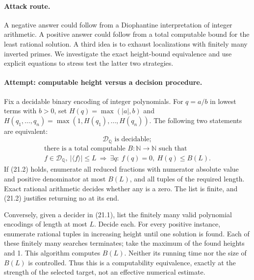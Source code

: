 \documentclass[11pt,a4paper]{article}
\newcommand{\N}{\mathbb{N}}
\newcommand{\Q}{\mathbb{Q}}
\begin{document}
\paragraph{Attack route.}
A negative answer could follow from a Diophantine interpretation of
integer arithmetic. A positive answer could follow from a total
computable bound for the least rational solution. A third idea is to
exhaust localizations with finitely many inverted primes. We investigate
the exact height-bound equivalence and use explicit equations to stress
test the latter two strategies.

\paragraph{Attempt: computable height versus a decision procedure.}
Fix a decidable binary encoding of integer polynomials. For
$q=a/b$ in lowest terms with $b>0$, set
$H(q)=\max(|a|,b)$ and $H(q_1,\ldots,q_n)=\max(1,H(q_1),\ldots,H(q_n))$.
The following two statements are equivalent:
\[
 \mathcal D_{\Q}\text{ is decidable};
 \tag{21.1}
\]
\[
 \begin{gathered}
 \text{there is a total computable }B:\N\to\N\text{ such that}\\
 f\in\mathcal D_{\Q},\ |\langle f\rangle|\leq L
 \ \Longrightarrow\ \exists q:\ f(q)=0,\ H(q)\leq B(L).
 \end{gathered}
 \tag{21.2}
\]
If (21.2) holds, enumerate all reduced fractions with numerator absolute
value and positive denominator at most $B(L)$, and all tuples of the
required length. Exact rational arithmetic decides whether any is a
zero. The list is finite, and (21.2) justifies returning no at its end.

Conversely, given a decider in (21.1), list the finitely many valid
polynomial encodings of length at most $L$. Decide each. For every
positive instance, enumerate rational tuples in increasing height until
one solution is found. Each of these finitely many searches terminates;
take the maximum of the found heights and 1. This algorithm computes
$B(L)$. Neither its running time nor the size of $B(L)$ is controlled.
Thus this is a computability equivalence, exactly at the strength of the
selected target, not an effective numerical estimate.
\end{document}
